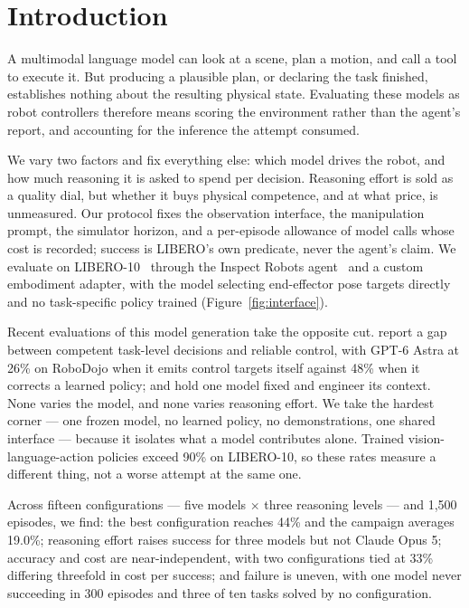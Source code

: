 \section{Introduction}

A multimodal language model can look at a scene, plan a motion, and call a tool
to execute it. But producing a plausible plan, or declaring the task finished,
establishes nothing about the resulting physical state. Evaluating these models
as robot controllers therefore means scoring the environment rather than the
agent's report, and accounting for the inference the attempt consumed.

We vary two factors and fix everything else: which model drives the robot, and
how much reasoning it is asked to spend per decision. Reasoning effort is sold
as a quality dial, but whether it buys physical competence, and at what price,
is unmeasured. Our protocol fixes the observation interface, the manipulation
prompt, the simulator horizon, and a per-episode allowance of model calls whose
cost is recorded; success is LIBERO's own predicate, never the agent's claim.
We evaluate on LIBERO-10~\citep{liu2023libero} through the Inspect Robots
agent~\citep{inspectrobots} and a custom embodiment adapter, with the model
selecting end-effector pose targets directly and no task-specific policy
trained (Figure~\ref{fig:interface}).

Recent evaluations of this model generation take the opposite cut.
\citet{galbot2026astra} report a gap between competent task-level decisions and
reliable control, with GPT-6 Astra at 26\% on RoboDojo when it emits control
targets itself against 48\% when it corrects a learned policy;
\citet{roboicl2026} and \citet{vlmagents2026} hold one model fixed and engineer
its context. None varies the model, and none varies reasoning effort. We take
the hardest corner --- one frozen model, no learned policy, no demonstrations,
one shared interface --- because it isolates what a model contributes alone.
Trained vision-language-action policies exceed 90\% on LIBERO-10, so these
rates measure a different thing, not a worse attempt at the same one.

Across fifteen configurations --- five models $\times$ three reasoning levels
--- and 1,500 episodes, we find: the best configuration reaches 44\% and the
campaign averages 19.0\%; reasoning effort raises success for three models but
not Claude Opus 5; accuracy and cost are near-independent, with
two configurations tied at 33\% differing threefold in cost per success; and
failure is uneven, with one model never succeeding in 300 episodes and three of
ten tasks solved by no configuration.
